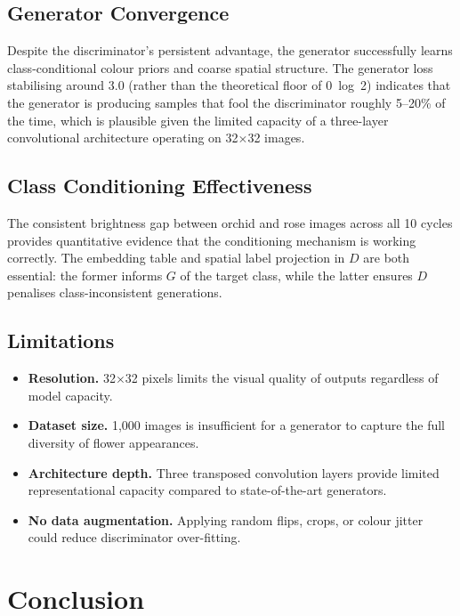 \documentclass[conference]{IEEEtran}
\begin{document}
\subsection{Generator Convergence}
Despite the discriminator's persistent advantage, the generator successfully learns class-conditional colour priors and coarse spatial structure. The generator loss stabilising around 3.0 (rather than the theoretical floor of 0~log~2) indicates that the generator is producing samples that fool the discriminator roughly 5--20\% of the time, which is plausible given the limited capacity of a three-layer convolutional architecture operating on 32$\times$32 images.

\subsection{Class Conditioning Effectiveness}
The consistent brightness gap between orchid and rose images across all 10 cycles provides quantitative evidence that the conditioning mechanism is working correctly. The embedding table and spatial label projection in $D$ are both essential: the former informs $G$ of the target class, while the latter ensures $D$ penalises class-inconsistent generations.

\subsection{Limitations}
\begin{itemize}
  \item \textbf{Resolution.} 32$\times$32 pixels limits the visual quality of outputs regardless of model capacity.
  \item \textbf{Dataset size.} 1{,}000 images is insufficient for a generator to capture the full diversity of flower appearances.
  \item \textbf{Architecture depth.} Three transposed convolution layers provide limited representational capacity compared to state-of-the-art generators.
  \item \textbf{No data augmentation.} Applying random flips, crops, or colour jitter could reduce discriminator over-fitting.
\end{itemize}

\section{Conclusion}
\label{sec:conclusion}
\end{document}
